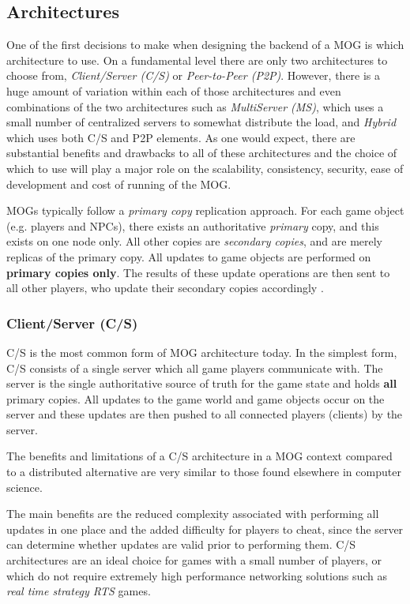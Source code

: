 \subsection{Architectures}
One of the first decisions to make when designing the backend of a MOG is which architecture to use. On a fundamental level there are only two architectures to choose from, \textit{Client/Server (C/S)} or \textit{Peer-to-Peer (P2P)}. However, there is a huge amount of variation within each of those architectures and even combinations of the two architectures such as \textit{MultiServer (MS)}, which uses a small number of centralized servers to somewhat distribute the load, and \textit{Hybrid} which uses both C/S and P2P elements. As one would expect, there are substantial benefits and drawbacks to all of these architectures and the choice of which to use will play a major role on the scalability, consistency, security, ease of development and cost of running of the MOG. 

MOGs typically follow a \textit{primary copy} replication approach. For each game object (e.g. players and NPCs), there exists an authoritative \textit{primary} copy, and this exists on one node only. All other copies are \textit{secondary copies}, and are merely replicas of the primary copy. All updates to game objects are performed on \textbf{primary copies only}. The results of these update operations are then sent to all other players, who update their secondary copies accordingly \cite{p2p-mog-survey}.

\subsubsection*{Client/Server (C/S)}
C/S is the most common form of MOG architecture today. In the simplest form, C/S consists of a single server which all game players communicate with. The server is the single authoritative source of truth for the game state and holds \textbf{all} primary copies. All updates to the game world and game objects occur on the server and these updates are then pushed to all connected players (clients) by the server.

The benefits and limitations of a C/S architecture in a MOG context compared to a distributed alternative are very similar to those found elsewhere in computer science. 

The main benefits are the reduced complexity associated with performing all updates in one place and the added difficulty for players to cheat, since the server can determine whether updates are valid prior to performing them. C/S architectures are an ideal choice for games with a small number of players, or which do not require extremely high performance networking solutions such as \textit{real time strategy RTS} games. 

